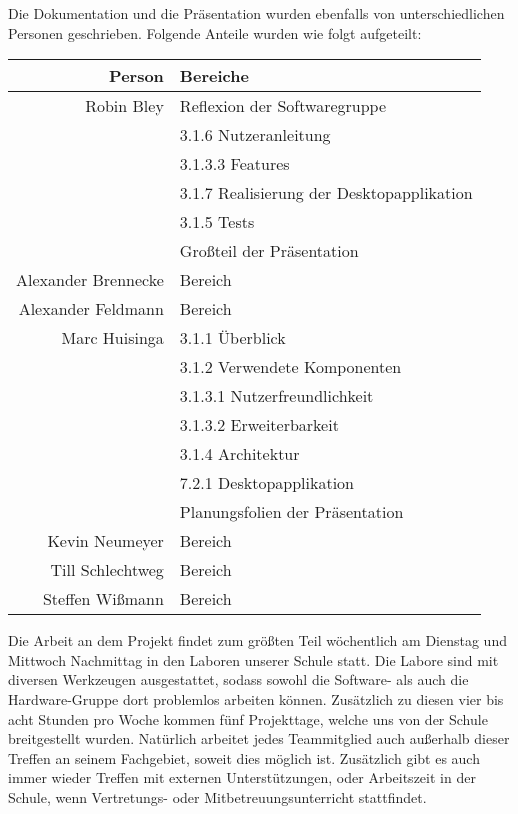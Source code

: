 Die Dokumentation und die Präsentation wurden ebenfalls von unterschiedlichen Personen geschrieben. Folgende Anteile wurden wie folgt aufgeteilt:

\begin{table}[H]
	\centering
	\begin{tabular}{rl}
		\toprule
		\textbf{Person} & \textbf{Bereiche} \\
		\midrule
		Robin Bley & Reflexion der Softwaregruppe \\
		 & 3.1.6 Nutzeranleitung \\
		 & 3.1.3.3 Features \\
		 & 3.1.7 Realisierung der Desktopapplikation \\
		 & 3.1.5 Tests \\
		 & Großteil der Präsentation \\
		Alexander Brennecke & Bereich \\
		Alexander Feldmann & Bereich \\
		Marc Huisinga & 3.1.1 Überblick \\
		 & 3.1.2 Verwendete Komponenten \\
		 & 3.1.3.1 Nutzerfreundlichkeit \\
		 & 3.1.3.2 Erweiterbarkeit \\
		 & 3.1.4 Architektur \\
		 & 7.2.1 Desktopapplikation \\
		 & Planungsfolien der Präsentation \\
		Kevin Neumeyer & Bereich \\
		Till Schlechtweg & Bereich \\
		Steffen Wißmann & Bereich \\
		\bottomrule
	\end{tabular}
\end{table}

Die Arbeit an dem Projekt findet zum größten Teil wöchentlich am Dienstag und Mittwoch Nachmittag in den Laboren unserer Schule statt. Die Labore sind mit diversen Werkzeugen ausgestattet, sodass sowohl die Software- als auch die Hardware-Gruppe dort problemlos arbeiten können. Zusätzlich zu diesen vier bis acht Stunden pro Woche kommen fünf Projekttage, welche uns von der Schule breitgestellt wurden. Natürlich arbeitet jedes Teammitglied auch außerhalb dieser Treffen an seinem Fachgebiet, soweit dies möglich ist. Zusätzlich gibt es auch immer wieder Treffen mit externen Unterstützungen, oder Arbeitszeit in der Schule, wenn Vertretungs- oder Mitbetreuungsunterricht stattfindet.


